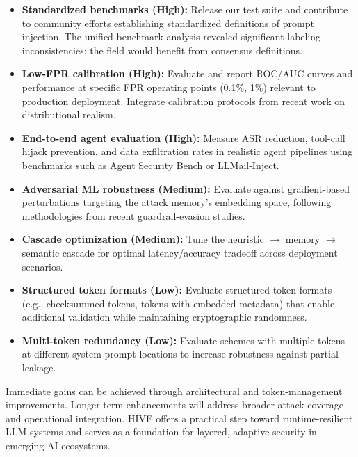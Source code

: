 \documentclass[manuscript,screen,review]{acmart}
\begin{document}
\begin{itemize}
\item \textbf{Standardized benchmarks (High):} Release our test suite and contribute to community efforts establishing standardized definitions of prompt injection. The unified benchmark analysis revealed significant labeling inconsistencies; the field would benefit from consensus definitions.

\item \textbf{Low-FPR calibration (High):} Evaluate and report ROC/AUC curves and performance at specific FPR operating points (0.1\%, 1\%) relevant to production deployment. Integrate calibration protocols from recent work on distributional realism.

\item \textbf{End-to-end agent evaluation (High):} Measure ASR reduction, tool-call hijack prevention, and data exfiltration rates in realistic agent pipelines using benchmarks such as Agent Security Bench or LLMail-Inject.

\item \textbf{Adversarial ML robustness (Medium):} Evaluate against gradient-based perturbations targeting the attack memory's embedding space, following methodologies from recent guardrail-evasion studies.

\item \textbf{Cascade optimization (Medium):} Tune the heuristic $\to$ memory $\to$ semantic cascade for optimal latency/accuracy tradeoff across deployment scenarios.

\item \textbf{Structured token formats (Low):} Evaluate structured token formats (e.g., checksummed tokens, tokens with embedded metadata) that enable additional validation while maintaining cryptographic randomness.

\item \textbf{Multi-token redundancy (Low):} Evaluate schemes with multiple tokens at different system prompt locations to increase robustness against partial leakage.
\end{itemize}

Immediate gains can be achieved through architectural and token-management improvements. Longer-term enhancements will address broader attack coverage and operational integration. HIVE offers a practical step toward runtime-resilient LLM systems and serves as a foundation for layered, adaptive security in emerging AI ecosystems.

\end{document}
